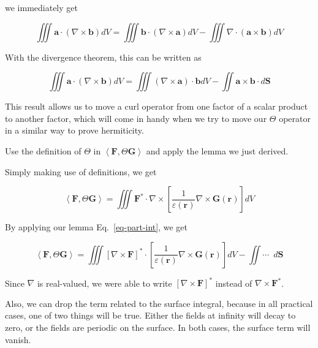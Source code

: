 we immediately get


\begin{equation}
\iiint {\mathbf a}  \cdot (\nabla \times {\mathbf b}) dV = \iiint {\mathbf b} \cdot ( \nabla \times {\mathbf a}) dV - \iiint \nabla \cdot ({\mathbf a} \times {\mathbf b}) dV 
\end{equation} 

With the divergence theorem, this can be written as

\begin{equation}
\iiint {\mathbf a}  \cdot (\nabla \times {\mathbf b}) dV = \iiint  ( \nabla \times {\mathbf a}) \cdot {\mathbf b} dV - \iint  {\mathbf a} \times {\mathbf b} \cdot d{\mathbf S} \label{eq-part-int}
\end{equation} 

This result allows us to move a curl operator from one factor of a scalar product to another factor, which will come in handy when we try to move our $\Theta$ operator in a similar way to prove hermiticity. 

\begin{cue}
Use the definition of  $\Theta$ in  $\left\langle {\mathbf F}, \Theta {\mathbf G}\right\rangle$ and apply the lemma we just derived.  
\end{cue}

Simply making use of definitions, we get

\begin{equation}
\left\langle {\mathbf F}, \Theta {\mathbf G}\right\rangle = \iiint {\mathbf F}^* \cdot\nabla \times \left[ \frac{1}{\varepsilon({\mathbf r})}\nabla \times {\mathbf G({\mathbf r})}  \right ] dV 
\end{equation} 

By applying our lemma Eq.~\ref{eq-part-int}, we get

\begin{equation}
\left\langle {\mathbf F}, \Theta {\mathbf G}\right\rangle = \iiint [ \nabla \times {\mathbf F}]^* \cdot \left[ \frac{1}{\varepsilon({\mathbf r})}\nabla \times {\mathbf G({\mathbf r})}  \right ] dV - \iint \cdots \enspace d{\mathbf S}
\label{eq-pos-omega}
\end{equation} 

Since $\nabla$ is real-valued, we were able to write $[ \nabla \times {\mathbf F}]^*$ instead of $\nabla \times {\mathbf F}^*$.

Also, we can drop the term related to the surface integral, because in all practical cases, one of two things will be true. Either the fields at infinity will decay to zero, or the fields are periodic on the surface. In both cases, the surface term will vanish.

